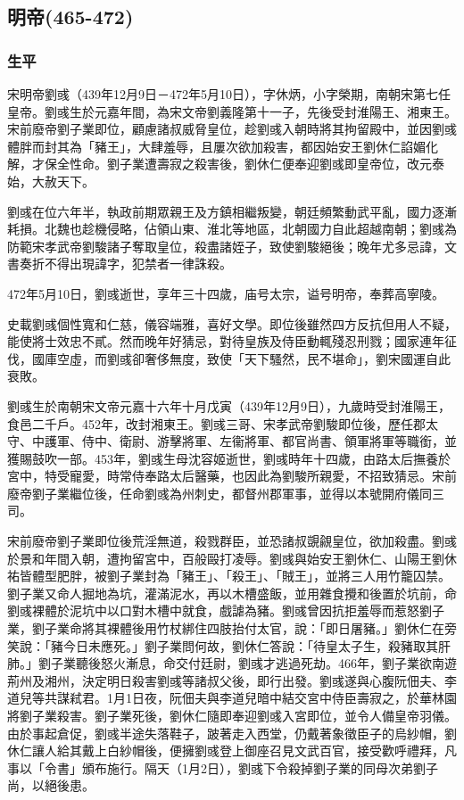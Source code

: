 
\subsection{明帝\tiny(465-472)}

\subsubsection{生平}

宋明帝劉彧（439年12月9日－472年5月10日），字休炳，小字榮期，南朝宋第七任皇帝。劉彧生於元嘉年間，為宋文帝劉義隆第十一子，先後受封淮陽王、湘東王。宋前廢帝劉子業即位，顧慮諸叔威脅皇位，趁劉彧入朝時將其拘留殿中，並因劉彧體胖而封其為「豬王」，大肆羞辱，且屢次欲加殺害，都因始安王劉休仁諂媚化解，才保全性命。劉子業遭壽寂之殺害後，劉休仁便奉迎劉彧即皇帝位，改元泰始，大赦天下。

劉彧在位六年半，執政前期眾親王及方鎮相繼叛變，朝廷頻繁動武平亂，國力逐漸耗損。北魏也趁機侵略，佔領山東、淮北等地區，北朝國力自此超越南朝；劉彧為防範宋孝武帝劉駿諸子奪取皇位，殺盡諸姪子，致使劉駿絕後；晚年尤多忌諱，文書奏折不得出現諱字，犯禁者一律誅殺。

472年5月10日，劉彧逝世，享年三十四歲，庙号太宗，谥号明帝，奉葬高寧陵。

史載劉彧個性寬和仁慈，儀容端雅，喜好文學。即位後雖然四方反抗但用人不疑，能使將士效忠不貳。然而晚年好猜忌，對待皇族及侍臣動輒殘忍刑戮；國家連年征伐，國庫空虛，而劉彧卻奢侈無度，致使「天下騷然，民不堪命」，劉宋國運自此衰敗。

劉彧生於南朝宋文帝元嘉十六年十月戊寅（439年12月9日），九歲時受封淮陽王，食邑二千戶。452年，改封湘東王。劉彧三哥、宋孝武帝劉駿即位後，歷任郡太守、中護軍、侍中、衛尉、游擊將軍、左衞將軍、都官尚書、領軍將軍等職銜，並獲賜鼓吹一部。453年，劉彧生母沈容姬逝世，劉彧時年十四歲，由路太后撫養於宮中，特受寵愛，時常侍奉路太后醫藥，也因此為劉駿所親愛，不招致猜忌。宋前廢帝劉子業繼位後，任命劉彧為州刺史，都督州郡軍事，並得以本號開府儀同三司。

宋前廢帝劉子業即位後荒淫無道，殺戮群臣，並恐諸叔覬覦皇位，欲加殺盡。劉彧於景和年間入朝，遭拘留宮中，百般毆打凌辱。劉彧與始安王劉休仁、山陽王劉休祐皆體型肥胖，被劉子業封為「豬王」、「殺王」、「賊王」，並將三人用竹籠囚禁。劉子業又命人掘地為坑，灌滿泥水，再以木槽盛飯，並用雜食攪和後置於坑前，命劉彧裸體於泥坑中以口對木槽中就食，戲謔為豬。劉彧曾因抗拒羞辱而惹怒劉子業，劉子業命將其裸體後用竹杖綁住四肢抬付太官，說：「即日屠豬。」劉休仁在旁笑說：「豬今日未應死。」劉子業問何故，劉休仁答說：「待皇太子生，殺豬取其肝肺。」劉子業聽後怒火漸息，命交付廷尉，劉彧才逃過死劫。466年，劉子業欲南遊荊州及湘州，決定明日殺害劉彧等諸叔父後，即行出發。劉彧遂與心腹阮佃夫、李道兒等共謀弒君。1月1日夜，阮佃夫與李道兒暗中結交宮中侍臣壽寂之，於華林園將劉子業殺害。劉子業死後，劉休仁隨即奉迎劉彧入宮即位，並令人備皇帝羽儀。由於事起倉促，劉彧半途失落鞋子，跛著走入西堂，仍戴著象徵臣子的烏紗帽，劉休仁讓人給其戴上白紗帽後，便擁劉彧登上御座召見文武百官，接受歡呼禮拜，凡事以「令書」頒布施行。隔天（1月2日），劉彧下令殺掉劉子業的同母次弟劉子尚，以絕後患。

